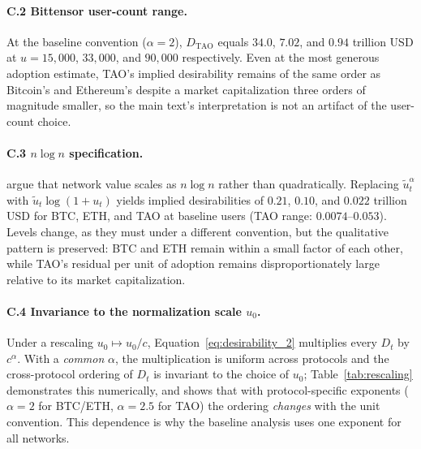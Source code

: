 \documentclass[12pt]{article}
\begin{document}
\paragraph{C.2 Bittensor user-count range.}
At the baseline convention (\(\alpha = 2\)), \( D_{\text{TAO}} \) equals \(34.0\), \(7.02\), and \(0.94\) trillion USD at \( u = 15{,}000 \), \( 33{,}000 \), and \( 90{,}000 \) respectively. Even at the most generous adoption estimate, TAO's implied desirability remains of the same order as Bitcoin's and Ethereum's despite a market capitalization three orders of magnitude smaller, so the main text's interpretation is not an artifact of the user-count choice.

\paragraph{C.3 \( n \log n \) specification.}
\citet{briscoe2006metcalfe} argue that network value scales as \( n \log n \) rather than quadratically. Replacing \( \tilde{u}_t^{\alpha} \) with \( \tilde{u}_t \log(1 + u_t) \) yields implied desirabilities of \(0.21\), \(0.10\), and \(0.022\) trillion USD for BTC, ETH, and TAO at baseline users (TAO range: \(0.0074\)--\(0.053\)). Levels change, as they must under a different convention, but the qualitative pattern is preserved: BTC and ETH remain within a small factor of each other, while TAO's residual per unit of adoption remains disproportionately large relative to its market capitalization.

\paragraph{C.4 Invariance to the normalization scale \( u_0 \).}
Under a rescaling \( u_0 \mapsto u_0 / c \), Equation~\eqref{eq:desirability_2} multiplies every \( D_t \) by \( c^{\alpha} \). With a \emph{common} \(\alpha\), the multiplication is uniform across protocols and the cross-protocol ordering of \( D_t \) is invariant to the choice of \( u_0 \); Table~\ref{tab:rescaling} demonstrates this numerically, and shows that with protocol-specific exponents (\(\alpha = 2\) for BTC/ETH, \(\alpha = 2.5\) for TAO) the ordering \emph{changes} with the unit convention. This dependence is why the baseline analysis uses one exponent for all networks.
\end{document}
